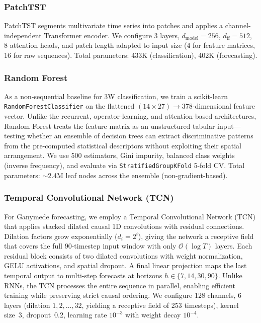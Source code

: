 \documentclass[conference]{IEEEtran}
\begin{document}
\subsubsection{PatchTST}

PatchTST \cite{patchtst} segments multivariate time series into patches and applies a channel-independent Transformer encoder. We configure 3 layers, $d_\text{model}{=}256$, $d_\text{ff}{=}512$, 8 attention heads, and patch length adapted to input size (4 for feature matrices, 16 for raw sequences). Total parameters: 433K (classification), 402K (forecasting).

\subsubsection{Random Forest}

As a non-sequential baseline for 3W classification, we train a scikit-learn \texttt{RandomForestClassifier} on the flattened $(14 \times 27) \to 378$-dimensional feature vector. Unlike the recurrent, operator-learning, and attention-based architectures, Random Forest treats the feature matrix as an unstructured tabular input---testing whether an ensemble of decision trees can extract discriminative patterns from the pre-computed statistical descriptors without exploiting their spatial arrangement. We use 500 estimators, Gini impurity, balanced class weights (inverse frequency), and evaluate via \texttt{StratifiedGroupKFold} 5-fold CV. Total parameters: $\sim$2.4M leaf nodes across the ensemble (non-gradient-based).

\subsubsection{Temporal Convolutional Network (TCN)}

For Ganymede forecasting, we employ a Temporal Convolutional Network (TCN) that applies stacked dilated causal 1D convolutions with residual connections. Dilation factors grow exponentially ($d_i = 2^i$), giving the network a receptive field that covers the full 90-timestep input window with only $\mathcal{O}(\log T)$ layers. Each residual block consists of two dilated convolutions with weight normalization, GELU activations, and spatial dropout. A final linear projection maps the last temporal output to multi-step forecasts at horizons $h \in \{7, 14, 30, 90\}$. Unlike RNNs, the TCN processes the entire sequence in parallel, enabling efficient training while preserving strict causal ordering. We configure 128 channels, 6 layers (dilation $1, 2, \ldots, 32$, yielding a receptive field of 253 timesteps), kernel size~3, dropout~0.2, learning rate $10^{-3}$ with weight decay $10^{-4}$.
\end{document}
